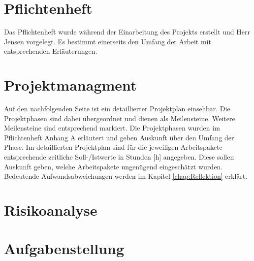 
\appendix

\chapter{Pflichtenheft}
\label{Pflichtenheft}

Das Pflichtenheft wurde während der Einarbeitung des Projekts erstellt und Herr Jensen vorgelegt. Es bestimmt einerseits den Umfang der Arbeit mit entsprechenden Erläuterungen.






\chapter{Projektmanagment}
\label{Projektmanagment}

Auf den nachfolgenden Seite ist ein detaillierter Projektplan einsehbar. Die Projektphasen sind dabei übergeordnet und dienen als Meilensteine. Weitere Meilensteine sind entsprechend markiert. Die Projektphasen wurden im Pflichtenheft Anhang A erläutert und geben Auskunft über den Umfang der Phase. Im detaillierten Projektplan sind für die jeweiligen Arbeitspakete entsprechende zeitliche Soll-/Istwerte in Stunden [h] angegeben. Diese sollen Auskunft geben, welche Arbeitspakete ungenügend eingeschätzt wurden. Bedeutende Aufwandsabweichungen werden im Kapitel \ref{chap:Reflektion} erklärt.

	\clearpage
{}
\recalctypearea

\clearpage
{}
\recalctypearea

\chapter{Risikoanalyse}

	\clearpage
	\recalctypearea
		
	\clearpage
	\recalctypearea

\chapter{Aufgabenstellung}


